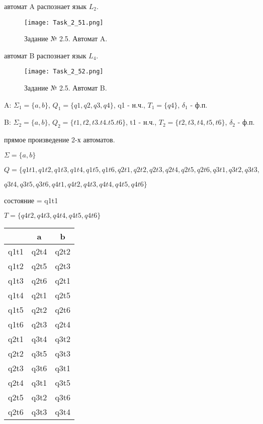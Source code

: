 \documentclass[a4paper, 12pt]{article}
\begin{document}
\begin{enumerate}
 автомат A распознает язык $L_2$.

\begin{figure}[!h]
\centering
\texttt{[image: Task\_2\_51.png]}
\caption{Задание № 2.5. Автомат A.}
\end{figure}

 автомат B распознает язык $L_4$.

\begin{figure}[!h]
\centering
\texttt{[image: Task\_2\_52.png]}
\caption{Задание № 2.5. Автомат B.}
\end{figure}

 A: $ \Sigma_1 = \{a, b\}$, $ Q_1 = \{q1, q2, q3, q4 \} $, q1 - н.ч., $ T_1 = \{q4 \} $, $ \delta_1 $ - ф.п.

 B: $ \Sigma_2 = \{a, b\}$, $ Q_2 = \{t1, t2, t3. t4. t5. t6\} $, t1 - н.ч., $ T_2 = \{t2, t3, t4, t5, t6 \} $, $ \delta_2 $ - ф.п.

 прямое произведение 2-х автоматов.

\noindent$ \Sigma = \{a, b\}$

\noindent$ Q = \{q1t1, q1t2, q1t3, q1t4, q1t5, q1t6, q2t1, q2t2, q2t3, q2t4, q2t5, q2t6, q3t1, q3t2, q3t3,$

$ q3t4, q3t5, q3t6, q4t1, q4t2, q4t3, q4t4, q4t5, q4t6\} $

 состояние = q1t1

\noindent$ T = \{q4t2, q4t3, q4t4, q4t5, q4t6 \}$

\begin{center}
\begin{tabular}{ |c|c|c| } 
\hline
\, & a & b \\
\hline
q1t1 & q2t4 & q2t2 \\
\hline
q1t2 & q2t5 & q2t3 \\
\hline
q1t3 & q2t6 & q2t1 \\
\hline
q1t4 & q2t1 & q2t5 \\
\hline
q1t5 & q2t2 & q2t6 \\
\hline
q1t6 & q2t3 & q2t4 \\
\hline

q2t1 & q3t4 & q3t2 \\
\hline
q2t2 & q3t5 & q3t3 \\
\hline
q2t3 & q3t6 & q3t1 \\
\hline
q2t4 & q3t1 & q3t5 \\
\hline
q2t5 & q3t2 & q3t6 \\
\hline
q2t6 & q3t3 & q3t4 \\
\hline


\end{tabular}
\end{center}
\end{enumerate}
\end{document}
